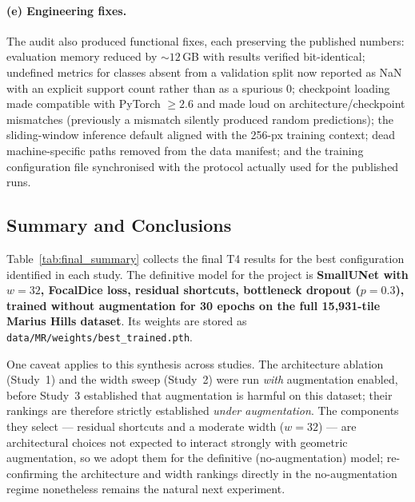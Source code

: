 \documentclass{aa}
\begin{document}
\paragraph{(e) Engineering fixes.}
The audit also produced functional fixes, each preserving the published numbers: evaluation memory reduced by ${\sim}12$\,GB with results verified bit-identical; undefined metrics for classes absent from a validation split now reported as NaN with an explicit support count rather than as a spurious 0; checkpoint loading made compatible with PyTorch $\geq 2.6$ and made loud on architecture/checkpoint mismatches (previously a mismatch silently produced random predictions); the sliding-window inference default aligned with the 256-px training context; dead machine-specific paths removed from the data manifest; and the training configuration file synchronised with the protocol actually used for the published runs.

\subsection{Summary and Conclusions}
\label{sec:mr_conclusions}

Table~\ref{tab:final_summary} collects the final T4 results for the best configuration identified in each study. The definitive model for the project is \textbf{SmallUNet with $w=32$, FocalDice loss, residual shortcuts, bottleneck dropout ($p=0.3$), trained without augmentation for 30 epochs on the full 15{,}931-tile Marius Hills dataset}. Its weights are stored as \texttt{data/MR/weights/best\_trained.pth}.

One caveat applies to this synthesis across studies. The architecture ablation (Study~1) and the width sweep (Study~2) were run \emph{with} augmentation enabled, before Study~3 established that augmentation is harmful on this dataset; their rankings are therefore strictly established \emph{under augmentation}. The components they select --- residual shortcuts and a moderate width ($w=32$) --- are architectural choices not expected to interact strongly with geometric augmentation, so we adopt them for the definitive (no-augmentation) model; re-confirming the architecture and width rankings directly in the no-augmentation regime nonetheless remains the natural next experiment.

\begin{table}[htbp]
\centering
\caption{Best result from each ablation study (full T4 run, 30 epochs).}
\label{tab:final_summary}
\end{table}
\end{document}
